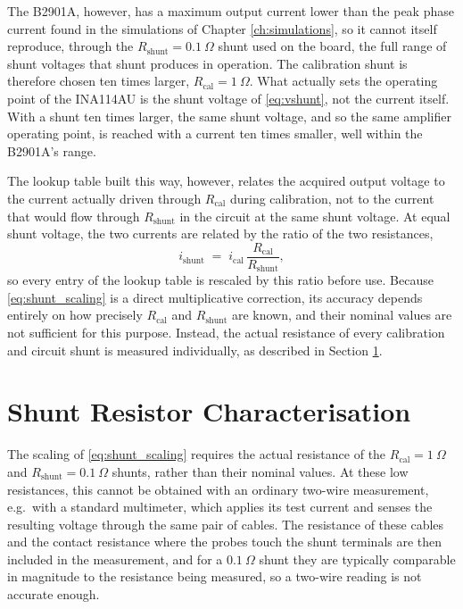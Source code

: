 The B2901A, however, has a maximum output current lower than the peak phase current found in the simulations of Chapter \ref{ch:simulations}, so it cannot itself reproduce, through the $R_\text{shunt}=0.1\ \Omega$ shunt used on the board, the full range of shunt voltages that shunt produces in operation. The calibration shunt is therefore chosen ten times larger, $R_\text{cal}=1\ \Omega$. What actually sets the operating point of the INA114AU is the shunt voltage of \eqref{eq:vshunt}, not the current itself. With a shunt ten times larger, the same shunt voltage, and so the same amplifier operating point, is reached with a current ten times smaller, well within the B2901A's range.

The lookup table built this way, however, relates the acquired output voltage to the current actually driven through $R_\text{cal}$ during calibration, not to the current that would flow through $R_\text{shunt}$ in the circuit at the same shunt voltage. At equal shunt voltage, the two currents are related by the ratio of the two resistances,
\begin{equation}
    i_\text{shunt} \;=\; i_\text{cal}\,\frac{R_\text{cal}}{R_\text{shunt}},
    \label{eq:shunt_scaling}
\end{equation}
so every entry of the lookup table is rescaled by this ratio before use. Because \eqref{eq:shunt_scaling} is a direct multiplicative correction, its accuracy depends entirely on how precisely $R_\text{cal}$ and $R_\text{shunt}$ are known, and their nominal values are not sufficient for this purpose. Instead, the actual resistance of every calibration and circuit shunt is measured individually, as described in Section \ref{sec:shunt_characterization}.


\section{Shunt Resistor Characterisation}
\label{sec:shunt_characterization}

The scaling of \eqref{eq:shunt_scaling} requires the actual resistance of the $R_\text{cal}=1\ \Omega$ and $R_\text{shunt}=0.1\ \Omega$ shunts, rather than their nominal values. At these low resistances, this cannot be obtained with an ordinary two-wire measurement, e.g.\ with a standard multimeter, which applies its test current and senses the resulting voltage through the same pair of cables. The resistance of these cables and the contact resistance where the probes touch the shunt terminals are then included in the measurement, and for a $0.1\ \Omega$ shunt they are typically comparable in magnitude to the resistance being measured, so a two-wire reading is not accurate enough.

